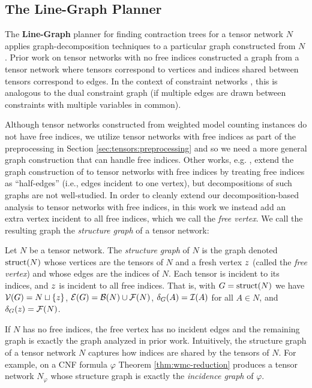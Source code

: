 \subsection{The Line-Graph Planner}
\label{sec:tensors:contraction-theory}
The \textbf{Line-Graph} planner for finding contraction trees for a tensor network $N$ applies graph-decomposition techniques to a particular graph constructed from $N$. Prior work \cite{MS08} on tensor networks with no free indices constructed a graph from a tensor network where tensors correspond to vertices and indices shared between tensors correspond to edges. In the context of constraint networks \cite{dechter03}, this is analogous to the dual constraint graph (if multiple edges are drawn between constraints with multiple variables in common).

Although tensor networks constructed from weighted model counting instances do not have free indices, we utilize tensor networks with free indices as part of the preprocessing in Section \ref{sec:tensors:preprocessing} and so we need a more general graph construction that can handle free indices. Other works, e.g. \cite{Ying17}, extend the graph construction of \cite{MS08} to tensor networks with free indices by treating free indices as ``half-edges'' (i.e., edges incident to one vertex), but decompositions of such graphs are not well-studied. In order to cleanly extend our decomposition-based analysis to tensor networks with free indices, in this work we instead add an extra vertex incident to all free indices, which we call the \emph{free vertex}. We call the resulting graph the \emph{structure graph} of a tensor network:
\begin{definition}\label{def:structure}
	Let $N$ be a tensor network. The \emph{structure graph} of $N$ is the graph denoted $\text{struct}(N)$ whose 
    vertices are the tensors of $N$ and a fresh vertex $z$ (called the \emph{free vertex}) and whose edges are the indices of $N$. Each tensor is incident to its indices, and $z$ is incident to all free indices.
    That is, with $G = \text{struct}(N)$ we have $\mathcal{V}(G) = N \sqcup \{ z \}$, $\mathcal{E}(G) = \mathcal{B}(N) \cup \mathcal{F}(N)$, $\delta_{G}(A) = \mathcal{I}(A)$ for all $A \in N$, and $\delta_{G}(z) = \mathcal{F}(N)$.
\end{definition}

If $N$ has no free indices, the free vertex has no incident edges and the remaining graph is exactly the graph analyzed in prior work. Intuitively, the structure graph of a tensor network $N$ captures how indices are shared by the tensors of $N$. For example, on a CNF formula $\varphi$ Theorem \ref{thm:wmc-reduction} produces a tensor network $N_\varphi$ whose structure graph is exactly the \emph{incidence graph} of $\varphi$. 

